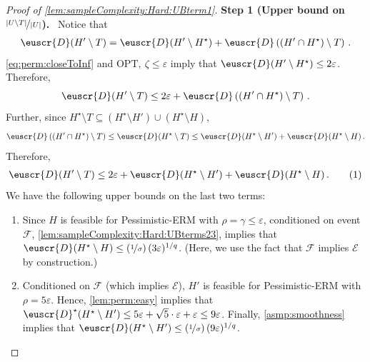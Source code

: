 \documentclass[11pt]{article}
\theoremstyle{plain}
\theoremstyle{definition}
\theoremstyle{remark}
\newcommand{\yesnum}{\addtocounter{equation}{1}\tag{\theequation}}
\def\abs#1{\left| #1 \right|}
\newcommand{\sinparen}[1]{(#1)}
\newcommand{\inparen}[1]{\left(#1\right)}
\newcommand{\evE}{\ensuremath{\mathscr{E}}}
\newcommand{\evF}{\ensuremath{\mathscr{F}}}
\newcommand{\nfrac}[2]{\nicefrac{#1}{#2}}
\newcommand{\opt}{\ensuremath{\mathrm{OPT}}}
\newcommand{\eps}{\varepsilon}
\newcommand{\customcal}[1]{\euscr{#1}}
\newcommand{\cD}{\customcal{D}}
\renewcommand{\paragraph}[1]{\medskip \noindent\textbf{#1}~}
\newcommand{\pERM}{Pessimistic-ERM}
\newcommand{\optset}{{H^\star}}
\newcommand{\cDtrue}{\cD^\star}
\begin{document}
\begin{proof}[Proof of \cref{lem:sampleComplexity:Hard:UBterm1}]
                \paragraph{Step 1 (Upper bound on $\nfrac{\abs{U\setminus T}}{\abs{U}}$).}
                    Notice that 
                    \begin{align*}
                        \cD(H'\setminus T)
                        = \cD(H'\setminus \optset)
                        + \cD\inparen{\sinparen{H'\cap \optset}\setminus T}\,.
                    \end{align*}
                    \cref{eq:perm:closeToInf} and $\opt,~\zeta\leq \eps$ imply that $\cD(H'\setminus \optset)\leq 2\eps$.
                    Therefore, 
                    \[
                        \cD(H'\setminus T)
                        \leq 2\eps
                        + \cD\inparen{\sinparen{H'\cap \optset}\setminus T}\,.
                    \]
                    Further, since $\optset\setminus T \subseteq \inparen{\optset \setminus H'} \cup \inparen{\optset\setminus H}$,
                    \[
                        \cD\inparen{\sinparen{H'\cap \optset}\setminus T}\leq \cD(\optset \setminus T)\leq \cD(\optset\setminus H')+ \cD(\optset\setminus H)\,.
                    \]
                    Therefore, 
                    \begin{align*}
                        \cD(H'\setminus T)
                        \leq 2\eps 
                        + \cD(\optset\setminus H')
                        + \cD(\optset\setminus H)\,.
                        \yesnum\label{eq:sampleComplexity:UBterm3:step1}
                    \end{align*}
                    We have the following upper bounds on the last two terms:
                    \begin{enumerate}
                        \item Since $H$ is feasible for \pERM{} with $\rho=\gamma\leq \eps$, conditioned on event $\evF$, \cref{lem:sampleComplexity:Hard:UBterms23}, implies that $\cD(\optset\setminus H)\leq (\nfrac{1}{\sigma})\,\sinparen{3\eps}^{1/q}$.
                        (Here, we use the fact that $\evF$ implies $\evE$ by construction.)
                        \item Conditioned on $\evF$ (which implies $\evE$), $H'$ is feasible for \pERM{} with $\rho=5\eps$.
                        Hence, \cref{lem:perm:easy} implies that $\cDtrue(\optset\setminus H')\leq 5\eps + \sqrt{5}\cdot \eps+\eps\leq 9\eps $.
                        Finally, \cref{asmp:smoothness} implies that $\cD(\optset\setminus H')\leq (\nfrac{1}{\sigma})\,(9\eps )^{1/q}$.

\end{enumerate}
\end{proof}
\end{document}

